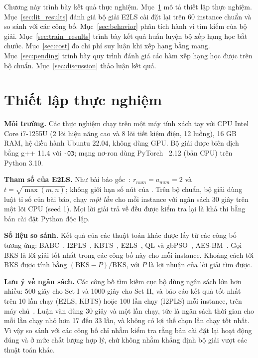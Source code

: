 \label{ch:chap4}

Chương này trình bày kết quả thực nghiệm. Mục~\ref{sec:setup} mô tả thiết lập thực nghiệm. Mục~\ref{sec:lit_results} đánh giá bộ giải E2LS cài đặt lại trên 60 instance chuẩn và so sánh với các công bố. Mục~\ref{sec:behavior} phân tích hành vi tìm kiếm của bộ giải. Mục~\ref{sec:train_results} trình bày kết quả huấn luyện bộ xếp hạng học bắt chước. Mục~\ref{sec:cost} đo chi phí suy luận khi xếp hạng bằng mạng. Mục~\ref{sec:pending} trình bày quy trình đánh giá các hàm xếp hạng học được trên bộ chuẩn. Mục~\ref{sec:discussion} thảo luận kết quả.

\section{Thiết lập thực nghiệm}\label{sec:setup}

\textbf{Môi trường.} Các thực nghiệm chạy trên một máy tính xách tay với CPU Intel Core i7-1255U (2 lõi hiệu năng cao và 8 lõi tiết kiệm điện, 12 luồng), 16 GB RAM, hệ điều hành Ubuntu 22.04, không dùng GPU. Bộ giải được biên dịch bằng g++ 11.4 với \texttt{-O3}; mạng nơ-ron dùng PyTorch~\cite{Paszke2019} 2.12 (bản CPU) trên Python 3.10.

\textbf{Tham số của E2LS.} Như bài báo gốc~\cite{Zhu2022}: $r_{num}=a_{num}=2$ và $t=\sqrt{\max(m,n)}$; không giới hạn số nút của \addstar. Trên bộ chuẩn, bộ giải dùng luật tỉ số của bài báo, chạy \emph{một lần} cho mỗi instance với ngân sách 30 giây trên một lõi CPU (seed 1). Mọi lời giải trả về đều được kiểm tra lại là khả thi bằng bản cài đặt Python độc lập.

\textbf{Số liệu so sánh.} Kết quả của các thuật toán khác được lấy từ các công bố tương ứng: BABC~\cite{He2018}, I2PLS~\cite{Wei2019}, KBTS~\cite{Wei2021}, E2LS~\cite{Zhu2022}, QL và gbPSO~\cite{Ozsoydan2023}, AES-BM~\cite{Zhao2024}. Gọi BKS là lời giải tốt nhất trong các công bố này cho mỗi instance. Khoảng cách tới BKS được tính bằng $(\text{BKS}-P)/\text{BKS}$, với $P$ là lợi nhuận của lời giải tìm được.

\textbf{Lưu ý về ngân sách.} Các công bố tìm kiếm cục bộ dùng ngân sách lớn hơn nhiều: 500 giây cho Set I và 1000 giây cho Set II, và báo cáo kết quả tốt nhất trên 10 lần chạy (E2LS, KBTS) hoặc 100 lần chạy (I2PLS) mỗi instance, trên máy chủ~\cite{Wei2019,Wei2021,Zhu2022}. Luận văn dùng 30 giây và một lần chạy, tức là ngân sách thời gian cho mỗi lần chạy nhỏ hơn 17 đến 33 lần, và không có lợi thế chọn lần chạy tốt nhất. Vì vậy so sánh với các công bố chỉ nhằm kiểm tra rằng bản cài đặt lại hoạt động đúng và ở mức chất lượng hợp lý, chứ không nhằm khẳng định bộ giải vượt các thuật toán khác.

